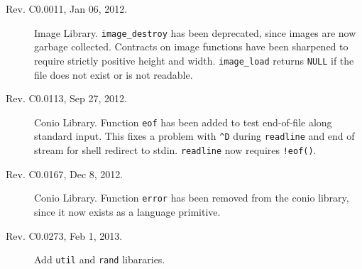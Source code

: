 \documentclass[11pt]{article}
\begin{document}
\begin{description}
\item[Rev. C0.0011, Jan 06, 2012.]  Image Library.
  \verb'image_destroy' has been deprecated, since images are now
  garbage collected.  Contracts on image functions have been sharpened
  to require strictly positive height and width.  \verb'image_load'
  returns \verb'NULL' if the file does not exist or is not readable.
\item[Rev. C0.0113, Sep 27, 2012.]  Conio Library.
  Function \verb'eof' has been added to test end-of-file along
  standard input.  This fixes a problem with \verb'^D' during
  \verb'readline' and end of stream for shell redirect to stdin.
  \verb'readline' now requires \verb'!eof()'.
\item[Rev. C0.0167, Dec 8, 2012.]  Conio Library.
  Function \verb'error' has been removed from the conio library, since
  it now exists as a language primitive.
\item[Rev. C0.0273, Feb 1, 2013.]  Add \verb'util' and \verb'rand' libararies.
\end{description}
\end{document}
